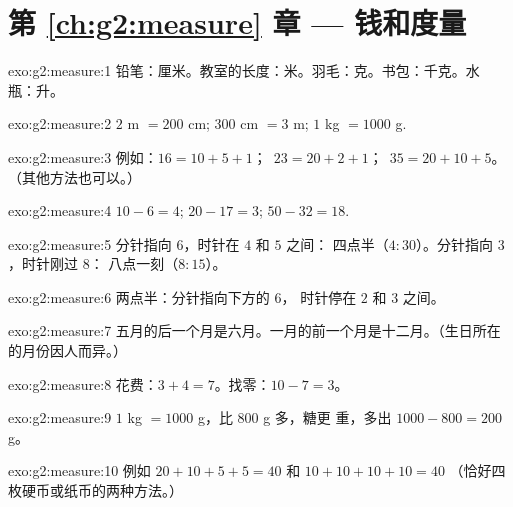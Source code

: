 \section*{第 \ref{ch:g2:measure} 章 --- 钱和度量}

\begin{solution}{exo:g2:measure:1}
铅笔：厘米。教室的长度：米。羽毛：克。书包：千克。水
瓶：升。
\end{solution}

\begin{solution}{exo:g2:measure:2}
$2$ m $= 200$ cm; \quad $300$ cm $= 3$ m; \quad $1$ kg $= 1000$ g.
\end{solution}

\begin{solution}{exo:g2:measure:3}
例如：$16 = 10 + 5 + 1$；\ $23 = 20 + 2 + 1$；\
$35 = 20 + 10 + 5$。（其他方法也可以。）
\end{solution}

\begin{solution}{exo:g2:measure:4}
$10 - 6 = 4$; \quad $20 - 17 = 3$; \quad $50 - 32 = 18$.
\end{solution}

\begin{solution}{exo:g2:measure:5}
分针指向 $6$，时针在 $4$ 和 $5$ 之间：
四点半（$4{:}30$）。分针指向 $3$，时针刚过 $8$：
八点一刻（$8{:}15$）。
\end{solution}

\begin{solution}{exo:g2:measure:6}
两点半：分针指向下方的 $6$，
时针停在 $2$ 和 $3$ 之间。
\end{solution}

\begin{solution}{exo:g2:measure:7}
五月的后一个月是六月。一月的前一个月是十二月。（生日所在的月份因人而异。）
\end{solution}

\begin{solution}{exo:g2:measure:8}
花费：$3 + 4 = 7$。找零：$10 - 7 = 3$。
\end{solution}

\begin{solution}{exo:g2:measure:9}
$1$ kg $= 1000$ g，比 $800$ g 多，糖更
重，多出 $1000 - 800 = 200$ g。
\end{solution}

\begin{solution}{exo:g2:measure:10}
例如 $20 + 10 + 5 + 5 = 40$ 和 $10 + 10 + 10 + 10 = 40$
（恰好四枚硬币或纸币的两种方法。）
\end{solution}
